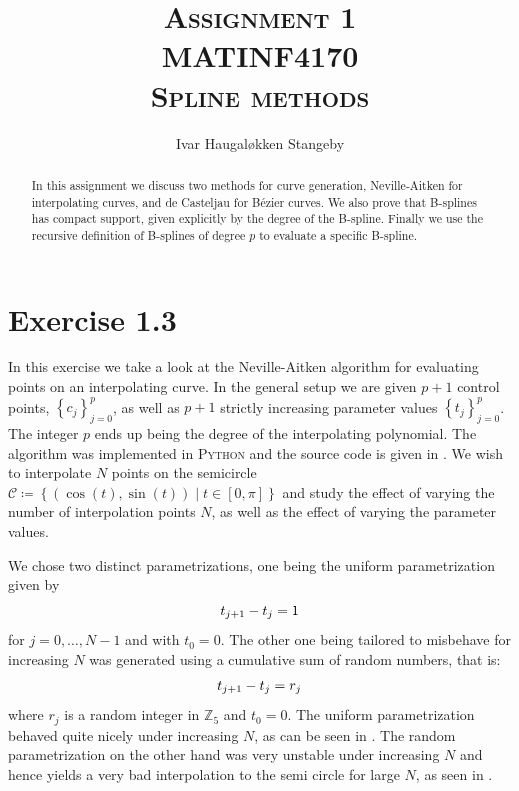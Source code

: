 \documentclass[a4paper]{article}
\title{\textsc{Assignment 1 \\ MATINF4170 \\ Spline methods}}
\author{Ivar Haugal{\o}kken Stangeby}
\begin{document}
    \maketitle

    \begin{abstract}
       In this assignment we discuss two methods for curve generation,
       Neville-Aitken for interpolating curves, and de Casteljau for B\'ezier
       curves. We also prove that B-splines has compact support, given
       explicitly by the degree of the B-spline. Finally we use the recursive
       definition of B-splines of degree $p$ to evaluate a specific B-spline.
    \end{abstract} 

    \section*{Exercise 1.3}
    \label{sec:exercise_1_3}
    
    In this exercise we take a look at the Neville-Aitken algorithm for
    evaluating points on an interpolating curve. In the general setup we are
    given $p+1$ control points, $\left\{ c_j \right\}_{j=0}^p$, as well as
    $p+1$ strictly increasing parameter values $\left\{ t_j \right\}_{j=0}^p$.
    The integer $p$ ends up being the degree of the interpolating polynomial.
    The algorithm was implemented in \textsc{Python} and the source code is
    given in .  We wish to interpolate $N$ points on the
    semicircle $\mathcal{C} \coloneqq \left\{ \left( \cos(t), \sin(t) \right)
    \mid t \in [0, \pi]\right\}$ and study the effect of varying the number of
    interpolation points $N$, as well as the effect of varying the parameter
    values. 
   
    We chose two distinct parametrizations, one being the uniform
    parametrization given by
    \begin{equation}
        \notag
        t_{j+1} - t_j = 1
    \end{equation}
    for $j = 0, \ldots, N-1$ and with $t_0 = 0$. The other one being tailored
    to misbehave for increasing $N$ was generated using a cumulative sum of
    random numbers, that is:
    \begin{equation}
        \notag
        t_{j+1} - t_j = r_j
    \end{equation}
    where $r_j$ is a random integer in $\mathbb{Z}_5$ and $t_0 = 0$.  The
    uniform parametrization behaved quite nicely under increasing $N$, as can
    be seen in .  The random parametrization on the other
    hand was very unstable under increasing $N$ and hence yields a very bad
    interpolation to the semi circle for large $N$, as seen in .
\end{document}
